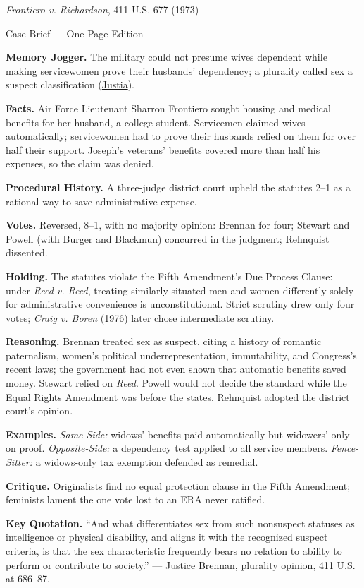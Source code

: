 \documentclass[12pt]{article}
\begin{document}
\begin{center}
{\Large \textit{Frontiero v. Richardson}, 411 U.S. 677 (1973)\par}
\vspace{0.3em}
{\normalsize Case Brief --- One-Page Edition\par}
\end{center}

\textbf{Memory Jogger.} The military could not presume wives dependent while making servicewomen prove their husbands' dependency; a plurality called sex a suspect classification (\href{https://supreme.justia.com/cases/federal/us/411/677/}{Justia}).

\textbf{Facts.} Air Force Lieutenant Sharron Frontiero sought housing and medical benefits for her husband, a college student. Servicemen claimed wives automatically; servicewomen had to prove their husbands relied on them for over half their support. Joseph's veterans' benefits covered more than half his expenses, so the claim was denied.

\textbf{Procedural History.} A three-judge district court upheld the statutes 2--1 as a rational way to save administrative expense.

\textbf{Votes.} Reversed, 8--1, with no majority opinion: Brennan for four; Stewart and Powell (with Burger and Blackmun) concurred in the judgment; Rehnquist dissented.

\textbf{Holding.} The statutes violate the Fifth Amendment's Due Process Clause: under \textit{Reed v. Reed}, treating similarly situated men and women differently solely for administrative convenience is unconstitutional. Strict scrutiny drew only four votes; \textit{Craig v. Boren} (1976) later chose intermediate scrutiny.

\textbf{Reasoning.} Brennan treated sex as suspect, citing a history of romantic paternalism, women's political underrepresentation, immutability, and Congress's recent laws; the government had not even shown that automatic benefits saved money. Stewart relied on \textit{Reed}. Powell would not decide the standard while the Equal Rights Amendment was before the states. Rehnquist adopted the district court's opinion.

\textbf{Examples.} \emph{Same-Side:} widows' benefits paid automatically but widowers' only on proof. \emph{Opposite-Side:} a dependency test applied to all service members. \emph{Fence-Sitter:} a widows-only tax exemption defended as remedial.

\textbf{Critique.} Originalists find no equal protection clause in the Fifth Amendment; feminists lament the one vote lost to an ERA never ratified.

\textbf{Key Quotation.} ``And what differentiates sex from such nonsuspect statuses as intelligence or physical disability, and aligns it with the recognized suspect criteria, is that the sex characteristic frequently bears no relation to ability to perform or contribute to society.'' --- Justice Brennan, plurality opinion, 411 U.S. at 686--87.
\end{document}
